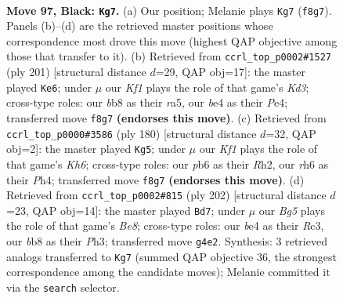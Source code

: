 \documentclass[11pt]{article}
\begin{document}
\clearpage

\begin{figure}[p]\centering
\begin{subfigure}{0.46\textwidth}\centering
\resizebox{\linewidth}{!}{%
\newchessgame
\chessboard[
  setfen={1B3k2/8/1P5R/P2N4/4B1b1/1K5p/8/6r1 b - - 0 97},
  showmover=false,
  pgfstyle=straightmove, color=movearrow, markmove={f8-g7}
]}
\caption{}
\end{subfigure}\hfill
\begin{subfigure}{0.46\textwidth}\centering
\resizebox{\linewidth}{!}{%
\newchessgame
\chessboard[
  setfen={8/8/3k1P2/R7/3Bp3/3bP3/5r2/3K4 b - - 12 101},
  showmover=false,
  pgfstyle=straightmove, color=movearrow, markmove={d6-e6}
]}
\caption{}
\end{subfigure}
\\[4pt]
\begin{subfigure}{0.46\textwidth}\centering
\resizebox{\linewidth}{!}{%
\newchessgame
\chessboard[
  setfen={8/8/1Br3pK/P7/6pP/2kb4/7R/8 w - - 0 91},
  showmover=false,
  pgfstyle=straightmove, color=movearrow, markmove={h6-g5}
]}
\caption{}
\end{subfigure}\hfill
\begin{subfigure}{0.46\textwidth}\centering
\resizebox{\linewidth}{!}{%
\newchessgame
\chessboard[
  setfen={4B3/8/7p/4knp1/P7/2R4P/r7/4K3 w - - 7 102},
  showmover=false,
  pgfstyle=straightmove, color=movearrow, markmove={e8-d7}
]}
\caption{}
\end{subfigure}
\caption{\textbf{Move 97, Black: \texttt{Kg7}.} (a) Our position; Melanie plays \texttt{Kg7} (\texttt{f8g7}). Panels (b)--(d) are the retrieved master positions whose correspondence most drove this move (highest QAP objective among those that transfer to it). (b) Retrieved from \texttt{ccrl\_top\_p0002\#1527} (ply 201) [structural distance $d$=29, QAP obj=17]: the master played \texttt{Ke6}; under $\mu$ our \emph{Kf1} plays the role of that game's \emph{Kd3}; cross-type roles: our \emph{b}b8 as their \emph{r}a5, our \emph{b}e4 as their \emph{P}e4; transferred move \texttt{f8g7} \textbf{(endorses this move)}. (c) Retrieved from \texttt{ccrl\_top\_p0000\#3586} (ply 180) [structural distance $d$=32, QAP obj=2]: the master played \texttt{Kg5}; under $\mu$ our \emph{Kf1} plays the role of that game's \emph{Kh6}; cross-type roles: our \emph{p}b6 as their \emph{R}h2, our \emph{r}h6 as their \emph{P}h4; transferred move \texttt{f8g7} \textbf{(endorses this move)}. (d) Retrieved from \texttt{ccrl\_top\_p0002\#815} (ply 202) [structural distance $d$=23, QAP obj=14]: the master played \texttt{Bd7}; under $\mu$ our \emph{Bg5} plays the role of that game's \emph{Be8}; cross-type roles: our \emph{b}e4 as their \emph{R}c3, our \emph{b}b8 as their \emph{P}h3; transferred move \texttt{g4e2}. Synthesis: 3 retrieved analogs transferred to \texttt{Kg7} (summed QAP objective 36, the strongest correspondence among the candidate moves); Melanie committed it via the \texttt{search} selector.}
\label{fig:thought-m193}
\end{figure}
\end{document}
